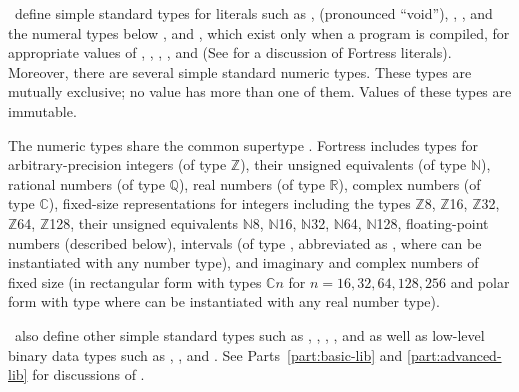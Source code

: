 \Library\ define simple standard types for literals such as
,
\TYP{()} (pronounced ``void''),
, , and
the numeral types below ,
 and
,
which exist only when a program is compiled,
for appropriate values of , , , , and 
(See  for a discussion of Fortress literals).
Moreover, there are several simple standard numeric types.
These types are mutually exclusive; no value has more than one of them.
Values of these types are immutable.

The numeric types share the common supertype .
Fortress includes types for
arbitrary-precision integers (of type $\mathbb{Z}$),
their unsigned equivalents (of type $\mathbb{N}$),
rational numbers (of type $\mathbb{Q}$),
real numbers (of type $\mathbb{R}$),
complex numbers (of type $\mathbb{C}$),
fixed-size representations for integers including the types
{$\mathbb{Z}$8}, {$\mathbb{Z}$16}, {$\mathbb{Z}$32}, {$\mathbb{Z}$64},
{$\mathbb{Z}$128}, their unsigned equivalents
{$\mathbb{N}$8}, {$\mathbb{N}$16}, {$\mathbb{N}$32}, {$\mathbb{N}$64},
{$\mathbb{N}$128},
floating-point numbers (described below),
intervals (of type ,
abbreviated as ,
where  can be instantiated
with any number type), and imaginary and complex numbers of fixed size
(in rectangular form with types $\mathbb{C}n$ for $n = 16, 32, 64, 128, 256$
and polar form with type  where  can
be instantiated with any real number type).

\Library\ also define other simple standard types such as ,
, , , and 
as well as low-level binary data types such as ,
, and .
See Parts~\ref{part:basic-lib} and \ref{part:advanced-lib} for discussions
of \library.


